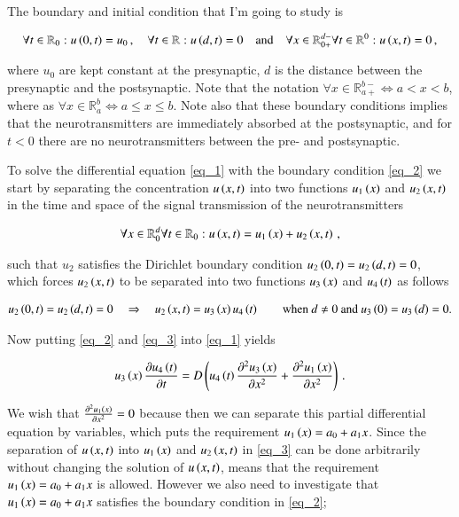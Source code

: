 \documentclass[11pt,english,a4paper]{article}
\begin{document}
\begin{flushleft}
The boundary and initial condition that I'm going to study is 

\begin{align}
\forall t \in\mathbb{R}_{0}: u\left({0,t}\right) = u_0\,, \quad \forall  t\in\mathbb{R} : u\left({d, t}\right) = 0 \quad \text{and} \quad \forall x\in\mathbb{R}_{0+}^{d-} \forall t \in \mathbb{R}^{0}:u\left({x,t}\right)=0\,,
\label{eq_2}
\end{align}

where $u_0$ are kept constant at the presynaptic, $d$ is the distance between the presynaptic and the postsynaptic. Note that the notation $\forall x\in\mathbb{R}_{a+}^{b-} \Leftrightarrow a < x < b$, where as $\forall x\in\mathbb{R}_{a}^{b} \Leftrightarrow a \leq x \leq b$. Note also that these boundary conditions implies that the neurotransmitters are immediately absorbed at the postsynaptic, and for $t<0$ there are no neurotransmitters between the pre- and postsynaptic. \linebreak

To solve the differential equation \eqref{eq_1} with the boundary condition \eqref{eq_2} we start by separating the concentration $u\left({x,t}\right)$ into two functions $u_1\left({x}\right)$ and $u_2\left({x,t}\right)$ in the time and space of the signal transmission of the neurotransmitters

\begin{align}
\forall x \in \mathbb{R}_0^d \forall t \in \mathbb{R}_{0}: u\left({x,t}\right) = u_1\left({x}\right) + u_2\left({x,t}\right) \,,
\label{eq_3}
\end{align}

such that $u_2$ satisfies the Dirichlet boundary condition $u_2\left({0,t}\right)=u_2\left({d,t}\right)=0$, which forces $u_2\left({x,t}\right)$ to be separated into two functions $u_3\left({x}\right)$ and $u_4\left({t}\right)$ as follows

\begin{align}
u_2\left({0,t}\right) = u_2\left({d,t}\right) = 0 \quad \Rightarrow \quad u_2\left({x,t}\right) = u_3\left({x}\right)u_4\left({t}\right) \qquad \text{when $d\neq 0$ and $u_3\left({0}\right)=u_3\left({d}\right)=0$.}
\label{eq_4}
\end{align}

Now putting \eqref{eq_2} and \eqref{eq_3} into \eqref{eq_1} yields

\begin{align*}
u_3\left({x}\right)\frac{\partial u_4\left({t}\right)}{\partial t} = D\left({u_4\left({t}\right)\frac{\partial^2 u_3\left({x}\right)}{\partial x^2} + \frac{\partial^2 u_1\left({x}\right)}{\partial x^2}}\right) \,.
\end{align*}

We wish that $\frac{\partial^2 u_1\left({x}\right)}{\partial x^2} =0$ because then we can separate this partial differential equation by variables, which puts the requirement $u_1\left({x}\right) = a_0 + a_1 x$. Since the separation of $u\left({x,t}\right)$ into $u_1\left({x}\right)$ and $u_2\left({x,t}\right)$ in \eqref{eq_3} can be done arbitrarily without changing the solution of $u\left({x,t}\right)$, means that the requirement $u_1\left({x}\right) = a_0 + a_1 x$ is allowed. However we also need to investigate that $u_1\left({x}\right) = a_0 + a_1 x$ satisfies the boundary condition in \eqref{eq_2};


\end{flushleft}
\end{document}
